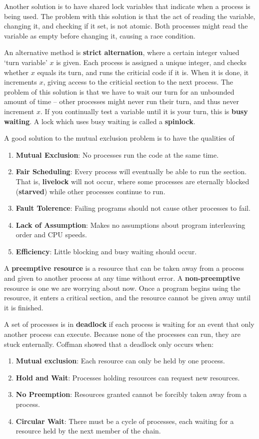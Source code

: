 Another solution is to have shared lock variables that indicate when a process is being used. The problem with this solution is that the act of reading the variable, changing it, and checking if it set, is not atomic. Both processes might read the variable as empty before changing it, causing a race condition.

An alternative method is {\bf strict alternation}, where a certain integer valued `turn variable' $x$ is given. Each process is assigned a unique integer, and checks whether $x$ equals its turn, and runs the criticial code if it is. When it is done, it increments $x$, giving access to the criticial section to the next process. The problem of this solution is that we have to wait our turn for an unbounded amount of time -- other processes might never run their turn, and thus never increment $x$. If you continually test a variable until it is your turn, this is {\bf busy waiting}. A lock which uses busy waiting is called a {\bf spinlock}.

A good solution to the mutual exclusion problem is to have the qualities of
%
\begin{enumerate}
    \item {\bf Mutual Exclusion}: No processes run the code at the same time.
    \item {\bf Fair Scheduling}: Every process will eventually be able to run the section. That is, {\bf livelock} will not occur, where some processes are eternally blocked ({\bf starved}) while other processes continue to run.
    \item {\bf Fault Tolerence}: Failing programs should not cause other processes to fail.
    \item {\bf Lack of Assumption}: Makes no assumptions about program interleaving order and CPU speeds.
    \item {\bf Efficiency}: Little blocking and busy waiting should occur.
\end{enumerate}

A {\bf preemptive resource} is a resource that can be taken away from a process and given to another process at any time without error. A {\bf non-preemptive} resource is one we are worrying about now. Once a program begins using the resource, it enters a critical section, and the resource cannot be given away until it is finished.

A set of processes is in {\bf deadlock} if each process is waiting for an event that only another process can execute. Because none of the processes can run, they are stuck enternally. Coffman showed that a deadlock only occurs when:
%
\begin{enumerate}
    \item {\bf Mutual exclusion}: Each resource can only be held by one process.
    \item {\bf Hold and Wait}: Processes holding resources can request new resources.
    \item {\bf No Preemption}: Resources granted cannot be forcibly taken away from a process.
    \item {\bf Circular Wait}: There must be a cycle of processes, each waiting for a resource held by the next member of the chain.
\end{enumerate}

